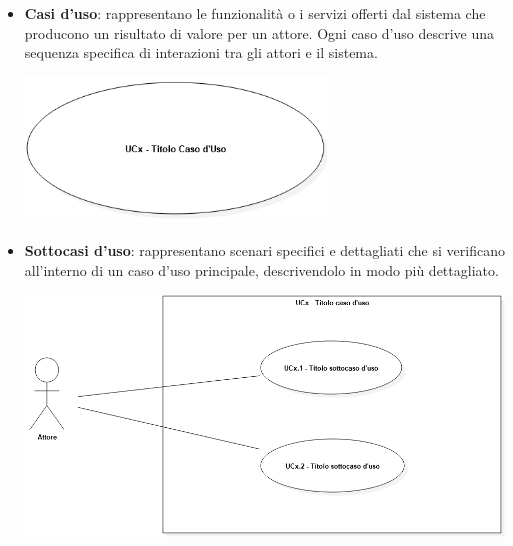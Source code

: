 \begin{itemize}
\begin{center}
		\end{center} 
	\item \textbf{Casi d'uso}: rappresentano le funzionalità o i servizi offerti dal sistema che producono un risultato di valore per un attore. Ogni caso d'uso descrive una sequenza specifica di interazioni tra gli attori e il sistema.
		\begin{center}
			\includegraphics*[width=8cm]{../../../images/norme_di_progetto/casoDiUso.png}
		\end{center}
	\newpage
	\item \textbf{Sottocasi d'uso}: rappresentano scenari specifici e dettagliati che si verificano all'interno di un caso d'uso principale, descrivendolo in modo più dettagliato. 
		\begin{center}
			\includegraphics*[width=15cm]{../../../images/norme_di_progetto/sottocasiDiUso.png}
		\end{center}


\end{itemize}
